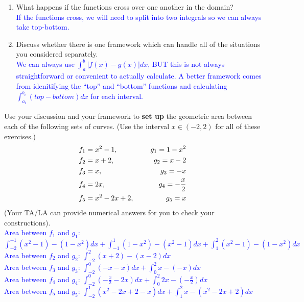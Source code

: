 \documentclass{ximera}
\begin{document}
\begin{exercise}
\begin{enumerate}
\begin{enumerate}
            \item What happens if the functions cross over one another in the domain?\\
            \textcolor{blue}{If the functions cross, we will need to split into two integrals so we can always take top-bottom.}
            \item Discuss whether there is one framework which can handle all of the situations you considered separately.\\
            \textcolor{blue}{We can always use $\int_a^b |f(x)-g(x)|dx$, BUT this is not always straightforward or convenient to actually calculate.  A better framework comes from idenitifying the ``top'' and ``bottom'' functions and calculating $\int_{a_i}^{b_i} (top-bottom) dx$ for each interval.}
        \end{enumerate}
    \end{enumerate}

\end{exercise}

\begin{exercise}
    Use your discussion and your framework to \textbf{set up} the geometric area between each of the following sets of curves. (Use the interval $x\in (-2,2)$ for all of these exercises.) %
    \begin{align}
        f_{1} &= x^2 -1, \hspace{.2in} &g_{1} = 1-x^2 \nonumber \\ 
        f_{2} &= x+2, \hspace{.2in} &g_{2} = x-2 \nonumber\\
        f_{3} &= x, \hspace{.2in} &g_{3}= -x \nonumber\\
        f_{4} &= 2x, \hspace{.2in} &g_{4}= -\frac{x}{2}\nonumber\\
        f_5 &= x^2-2x+2, \hspace{.2in} &g_5 = x \nonumber
    \end{align}
    (Your TA/LA can provide numerical answers for you to check your constructions).\\
    \textcolor{blue}{ Area between $f_1$ and $g_1$: $\int_{-2}^{-1}(x^2-1)-(1-x^2)dx + \int_{-1}^1 (1-x^2)-(x^2-1)dx+\int_1^2 (x^2-1)-(1-x^2)dx$\\
    Area between $f_2$ and $g_2$: $\int_{-2}^2 (x+2)-(x-2)dx$\\
    Area between $f_3$ and $g_3$: $\int_{-2}^0 (-x-x)dx+\int_0^2 x-(-x)dx$\\
    Area between $f_4$ and $g_4$: $\int_{-2}^0 (-\frac{x}{2}-2x)dx +\int_0^2 2x-(-\frac{x}{2})dx$\\
    Area between $f_5$ and $g_5$: $\int_{-2}^1 (x^2-2x+2-x)dx+\int_1^2 x-(x^2-2x+2)dx$ }
\end{exercise}
\end{document}
